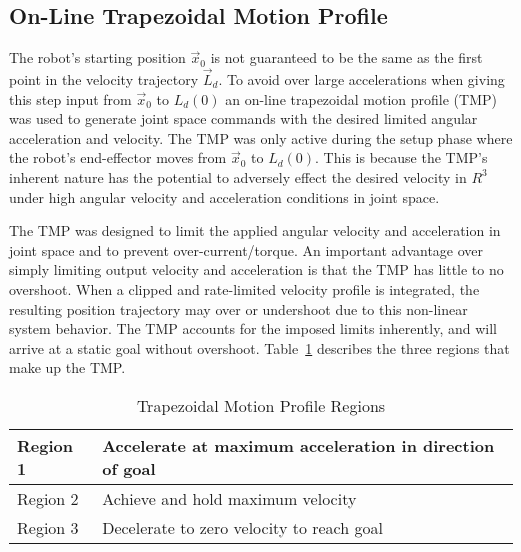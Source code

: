 \subsection{On-Line Trapezoidal Motion Profile}\label{sec:trap}

The robot's starting position $\vec{x}_0$ is not guaranteed to be the same as the
first point in the velocity trajectory $\vec{L}_d$.  To avoid over large
accelerations when giving this step input from $\vec{x}_0$ to $L_d(0)$ an on-line
trapezoidal motion profile (TMP) was used to generate joint space commands with
the desired limited angular acceleration and velocity.  The TMP was only active
during the setup phase where the robot's end-effector moves from $\vec{x}_0$ to
$L_d(0)$.  This is because the TMP's inherent nature has the potential to adversely effect the desired velocity in $R^3$ under high angular velocity and acceleration conditions in joint space.

The TMP was designed to limit the applied angular velocity and acceleration in
joint space and to prevent over-current/torque. An important advantage over
simply limiting output velocity and acceleration is that the TMP has little to
no overshoot. When a clipped and rate-limited velocity profile is integrated,
the resulting position trajectory may over or undershoot due to this non-linear
system behavior.  The TMP accounts for the imposed limits inherently, and will
arrive at a static goal without overshoot.  Table~\ref{table:trap} describes the three regions
that make up the TMP.


\begin{table}[h]
\centering
\caption{Trapezoidal Motion Profile Regions}
\begin{tabular}{|l||l|}
\hline
Region 1	&	Accelerate at maximum acceleration in direction of goal \\ \hline
Region 2	& Achieve and hold maximum velocity \\ \hline
Region 3 	& Decelerate to zero velocity to reach goal \\ \hline
\end{tabular}

\label{table:trap}
\end{table}


